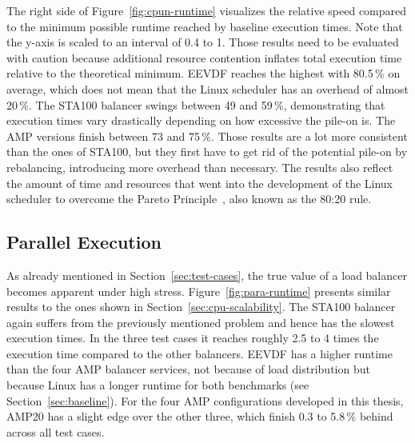 The right side of Figure~\ref{fig:cpun-runtime} visualizes the relative speed compared to the minimum possible runtime reached by baseline execution times.
Note that the y-axis is scaled to an interval of 0.4 to 1.
Those results need to be evaluated with caution because additional resource contention inflates total execution time relative to the theoretical minimum.
EEVDF reaches the highest with 80.5\,\% on average, which does not mean that the Linux scheduler has an overhead of almost 20\,\%.
The STA100 balancer swings between 49 and 59\,\%, demonstrating that execution times vary drastically depending on how excessive the pile-on is.
The AMP versions finish between 73 and 75\,\%.
Those results are a lot more consistent than the ones of STA100, but they first have to get rid of the potential pile-on by rebalancing, introducing more overhead than necessary.
The results also reflect the amount of time and resources that went into the development of the Linux scheduler to overcome the Pareto Principle~\cite{pareto_principle}, also known as the 80:20 rule.

\subsection{Parallel Execution}
\label{sec:para-execution}

As already mentioned in Section~\ref{sec:test-cases}, the true value of a load balancer becomes apparent under high stress.
Figure~\ref{fig:para-runtime} presents similar results to the ones shown in Section~\ref{sec:cpu-scalability}.
The STA100 balancer again suffers from the previously mentioned problem and hence has the slowest execution times.
In the three test cases it reaches roughly 2.5 to 4 times the execution time compared to the other balancers.
EEVDF has a higher runtime than the four AMP balancer services, not because of load distribution but because Linux has a longer runtime for both benchmarks (see Section~\ref{sec:baseline}).
For the four AMP configurations developed in this thesis, AMP20 has a slight edge over the other three, which finish 0.3 to 5.8\,\% behind across all test cases.

